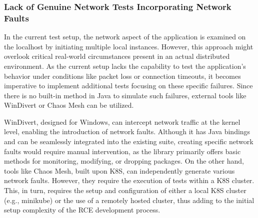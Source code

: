 \subsubsection{Lack of Genuine Network Tests Incorporating Network Faults}
\label{sub:lack-network-tests}

In the current test setup, the network aspect of the application is examined on the localhost by initiating multiple local instances. However, this approach might overlook critical real-world circumstances present in an actual distributed environment. As the current setup lacks the capability to test the application's behavior under conditions like packet loss or connection timeouts, it becomes imperative to implement additional tests focusing on these specific failures. Since there is no built-in method in Java to simulate such failures, external tools like WinDivert or Chaos Mesh can be utilized.

WinDivert, designed for Windows, can intercept network traffic at the kernel level, enabling the introduction of network faults. Although it has Java bindings and can be seamlessly integrated into the existing suite, creating specific network faults would require manual intervention, as the library primarily offers basic methods for monitoring, modifying, or dropping packages. On the other hand, tools like Chaos Mesh, built upon \ac{K8S}, can independently generate various network faults. However, they require the execution of tests within a \ac{K8S} cluster. This, in turn, requires the setup and configuration of either a local \ac{K8S} cluster (e.g., minikube) or the use of a remotely hosted cluster, thus adding to the initial setup complexity of the \ac{RCE} development process.
